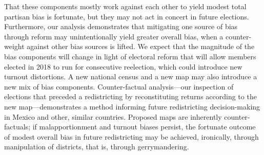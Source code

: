 \documentclass[letter,12pt]{article}
\begin{document}
That these components mostly work against each other to yield modest total partisan bias is fortunate, but they may not act in concert in future elections. Furthermore, our analysis demonstrates that mitigating one source of bias through reform may unintentionally yield greater overall bias, when a counter-weight against other bias sources is lifted. We expect that the magnitude of the bias components will change in light of electoral reform that will allow members elected in 2018 to run for consecutive reelection, which could introduce new turnout distortions. A new national census and a new map may also introduce a new mix of bias components. Counter-factual analysis---our inspection of elections that preceded a redistricting by reconstituting returns according to the new map---demonstrates a method informing future redistricting decision-making in Mexico and other, similar countries. Proposed maps are inherently counter-factuals; if malapportionment and turnout biases persist, the fortunate outcome of modest overall bias in future redistricting may be achieved, ironically, through manipulation of districts, that is, through gerrymandering.




\end{document}
